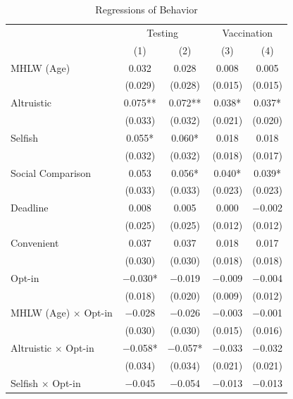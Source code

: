\documentclass[
  11pt,
  a4paper
]{article}
\begin{document}
\begin{table}

\caption{\label{tab:reg-act}Regressions of Behavior}
\centering
\fontsize{9}{11}\selectfont
\begin{threeparttable}
\begin{tabular}[t]{lcccc}
\toprule
\multicolumn{1}{c}{ } & \multicolumn{2}{c}{Testing} & \multicolumn{2}{c}{Vaccination} \\
\cmidrule(l{3pt}r{3pt}){2-3} \cmidrule(l{3pt}r{3pt}){4-5}
  & (1) & (2) & (3) & (4)\\
\midrule
MHLW (Age) & \num{0.032} & \num{0.028} & \num{0.008} & \num{0.005}\\
 & (\num{0.029}) & (\num{0.028}) & (\num{0.015}) & (\num{0.015})\\
Altruistic & \num{0.075}** & \num{0.072}** & \num{0.038}* & \num{0.037}*\\
 & (\num{0.033}) & (\num{0.032}) & (\num{0.021}) & (\num{0.020})\\
Selfish & \num{0.055}* & \num{0.060}* & \num{0.018} & \num{0.018}\\
 & (\num{0.032}) & (\num{0.032}) & (\num{0.018}) & (\num{0.017})\\
Social Comparison & \num{0.053} & \num{0.056}* & \num{0.040}* & \num{0.039}*\\
 & (\num{0.033}) & (\num{0.033}) & (\num{0.023}) & (\num{0.023})\\
Deadline & \num{0.008} & \num{0.005} & \num{0.000} & \num{-0.002}\\
 & (\num{0.025}) & (\num{0.025}) & (\num{0.012}) & (\num{0.012})\\
Convenient & \num{0.037} & \num{0.037} & \num{0.018} & \num{0.017}\\
 & (\num{0.030}) & (\num{0.030}) & (\num{0.018}) & (\num{0.018})\\
Opt-in & \num{-0.030}* & \num{-0.019} & \num{-0.009} & \num{-0.004}\\
 & (\num{0.018}) & (\num{0.020}) & (\num{0.009}) & (\num{0.012})\\
MHLW (Age) $\times$ Opt-in & \num{-0.028} & \num{-0.026} & \num{-0.003} & \num{-0.001}\\
 & (\num{0.030}) & (\num{0.030}) & (\num{0.015}) & (\num{0.016})\\
Altruistic $\times$ Opt-in & \num{-0.058}* & \num{-0.057}* & \num{-0.033} & \num{-0.032}\\
 & (\num{0.034}) & (\num{0.034}) & (\num{0.021}) & (\num{0.021})\\
Selfish $\times$ Opt-in & \num{-0.045} & \num{-0.054} & \num{-0.013} & \num{-0.013}\\

\end{tabular}
\end{threeparttable}
\end{table}
\end{document}
